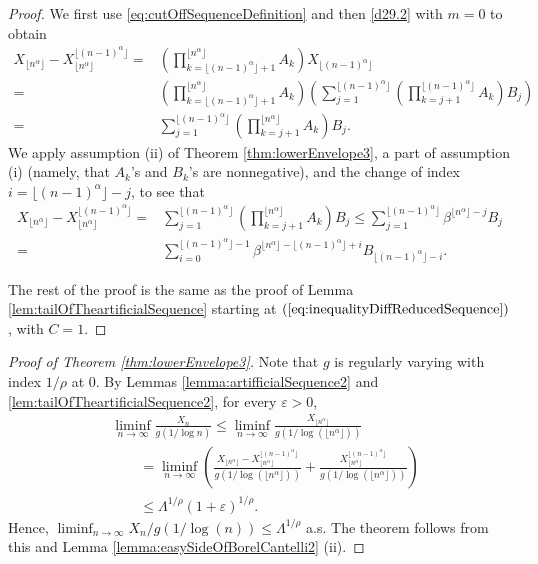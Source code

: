 \documentclass[bj]{imsart}
\numberwithin{equation}{section}
\newcommand{\1}{\mathbf{1}}
\theoremstyle{definition}
\begin{document}
\begin{proof}

We first use \eqref{eq:cutOffSequenceDefinition} and then \eqref{d29.2} with $m=0$ to obtain
\begin{align*}
X_{\lfloor n^\alpha \rfloor}-X_{\lfloor n^\alpha \rfloor}^{\lfloor (n-1)^\alpha \rfloor}
= &\left(\prod_{k=\lfloor (n-1)^\alpha \rfloor+1}^{\lfloor n^\alpha \rfloor}A_k\right) X_{\lfloor (n-1)^\alpha \rfloor}\\
= &\left(\prod_{k=\lfloor (n-1)^\alpha \rfloor+1}^{\lfloor n^\alpha \rfloor}A_k\right) \left(\sum_{j=1}^{\lfloor (n-1)^\alpha \rfloor}\left(\prod_{k=j+1}^{\lfloor (n-1)^\alpha \rfloor} A_k\right)B_j\right)\\
=&\sum_{j=1}^{\lfloor (n-1)^\alpha \rfloor}\left(\prod_{k=j+1}^{\lfloor n^\alpha \rfloor} A_k\right)B_j.
\end{align*}
We apply assumption (ii) of Theorem \ref{thm:lowerEnvelope3},  a part of assumption (i) (namely, that $A_k$'s and $B_k$'s are nonnegative), and the change of index $i=\lfloor (n-1)^\alpha \rfloor-j$, to see that
\begin{align*}
X_{\lfloor n^\alpha \rfloor}-X_{\lfloor n^\alpha \rfloor}^{\lfloor (n-1)^\alpha \rfloor}
= &\sum_{j=1}^{\lfloor (n-1)^\alpha \rfloor}\left(\prod_{k=j+1}^{\lfloor n^\alpha \rfloor} A_k\right)B_j\leq \sum_{j=1}^{\lfloor (n-1)^\alpha \rfloor}\beta^{\lfloor n^\alpha \rfloor-j} B_j\\
=&\sum_{i=0}^{\lfloor (n-1)^\alpha \rfloor-1} \beta^{\lfloor n^\alpha \rfloor-\lfloor (n-1)^\alpha \rfloor+i} B_{\lfloor (n-1)^\alpha \rfloor-i}.
\end{align*}

The rest of the proof is the same as the proof of Lemma \ref{lem:tailOfTheartificialSequence} starting at $(\ref{eq:inequalityDiffReducedSequence})$, with $C=1$.
\end{proof}

\begin{proof}[Proof of Theorem \ref{thm:lowerEnvelope3}]
Note that $g$ is regularly varying with index $1/\rho$ at 0.
By Lemmas \ref{lemma:artifficialSequence2} and \ref{lem:tailOfTheartificialSequence2}, for every $\varepsilon>0$,
\begin{align*}
&\liminf_{n\to \infty}\frac{ X_n}{g(1/\log n)}
\leq \liminf_{n\to \infty} \frac{X_{\lfloor n^\alpha \rfloor}}{g(1/\log \left( \lfloor n^\alpha \rfloor\right))}\\
&\qquad=
\liminf_{n\to \infty}
\left( \frac{X_{\lfloor n^\alpha \rfloor}-X_{\lfloor n^\alpha \rfloor}^{\lfloor (n-1)^\alpha \rfloor}}{g(1/\log \left( \lfloor n^\alpha \rfloor\right))}
+  \frac{X_{\lfloor n^\alpha \rfloor}^{\lfloor (n-1)^\alpha \rfloor}}{g(1/\log  \left( \lfloor n^\alpha \rfloor\right))} \right)\\
&\qquad\leq \Lambda^{1/\rho}(1+\varepsilon)^{1/\rho}.
\end{align*}
Hence, $\liminf_{n\to \infty} X_n/g(1/\log (n) ) \leq \Lambda^{1/\rho}$ a.s. 
The theorem follows from this and Lemma \ref{lemma:easySideOfBorelCantelli2} (ii). 
\end{proof}
\end{document}
